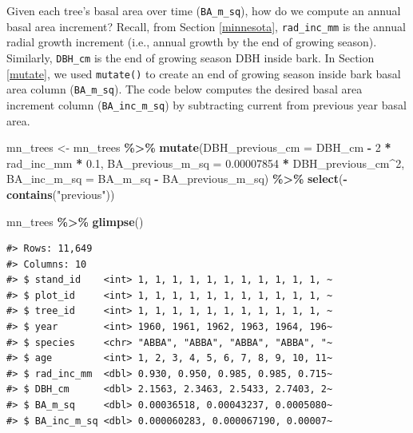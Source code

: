 \documentclass[
  11pt,
]{krantz}
\newenvironment{Shaded}{\begin{snugshade}}{\end{snugshade}}
\newcommand{\DataTypeTok}[1]{\textcolor[rgb]{0.13,0.29,0.53}{#1}}
\newcommand{\DecValTok}[1]{\textcolor[rgb]{0.00,0.00,0.81}{#1}}
\newcommand{\FloatTok}[1]{\textcolor[rgb]{0.00,0.00,0.81}{#1}}
\newcommand{\KeywordTok}[1]{\textcolor[rgb]{0.13,0.29,0.53}{\textbf{#1}}}
\newcommand{\NormalTok}[1]{#1}
\newcommand{\OperatorTok}[1]{\textcolor[rgb]{0.81,0.36,0.00}{\textbf{#1}}}
\newcommand{\StringTok}[1]{\textcolor[rgb]{0.31,0.60,0.02}{#1}}
\theoremstyle{definition}
\theoremstyle{definition}
\theoremstyle{definition}
\theoremstyle{definition}
\theoremstyle{remark}
\begin{document}
Given each tree's basal area over time (\texttt{BA\_m\_sq}), how do we compute an annual basal area increment? Recall, from Section \ref{minnesota}, \texttt{rad\_inc\_mm} is the annual radial growth increment (i.e., annual growth by the end of growing season). Similarly, \texttt{DBH\_cm} is the end of growing season DBH inside bark. In Section \ref{mutate}, we used \texttt{mutate()} to create an end of growing season inside bark basal area column (\texttt{BA\_m\_sq}). The code below computes the desired basal area increment column (\texttt{BA\_inc\_m\_sq}) by subtracting current from previous year basal area.

\begin{Shaded}
\begin{Highlighting}[]
\NormalTok{mn\_trees \textless{}{-}}\StringTok{ }\NormalTok{mn\_trees }\OperatorTok{\%\textgreater{}\%}\StringTok{ }
\StringTok{  }\KeywordTok{mutate}\NormalTok{(}\DataTypeTok{DBH\_previous\_cm =}\NormalTok{ DBH\_cm }\OperatorTok{{-}}\StringTok{ }\DecValTok{2} \OperatorTok{*}\StringTok{ }\NormalTok{rad\_inc\_mm }\OperatorTok{*}\StringTok{ }\FloatTok{0.1}\NormalTok{,}
         \DataTypeTok{BA\_previous\_m\_sq =} \FloatTok{0.00007854} \OperatorTok{*}\StringTok{ }\NormalTok{DBH\_previous\_cm}\OperatorTok{\^{}}\DecValTok{2}\NormalTok{,}
         \DataTypeTok{BA\_inc\_m\_sq =}\NormalTok{ BA\_m\_sq }\OperatorTok{{-}}\StringTok{ }\NormalTok{BA\_previous\_m\_sq) }\OperatorTok{\%\textgreater{}\%}
\StringTok{  }\KeywordTok{select}\NormalTok{(}\OperatorTok{{-}}\KeywordTok{contains}\NormalTok{(}\StringTok{"previous"}\NormalTok{))}

\NormalTok{mn\_trees }\OperatorTok{\%\textgreater{}\%}\StringTok{ }\KeywordTok{glimpse}\NormalTok{()}
\end{Highlighting}
\end{Shaded}

\begin{verbatim}
#> Rows: 11,649
#> Columns: 10
#> $ stand_id    <int> 1, 1, 1, 1, 1, 1, 1, 1, 1, 1, 1, ~
#> $ plot_id     <int> 1, 1, 1, 1, 1, 1, 1, 1, 1, 1, 1, ~
#> $ tree_id     <int> 1, 1, 1, 1, 1, 1, 1, 1, 1, 1, 1, ~
#> $ year        <int> 1960, 1961, 1962, 1963, 1964, 196~
#> $ species     <chr> "ABBA", "ABBA", "ABBA", "ABBA", "~
#> $ age         <int> 1, 2, 3, 4, 5, 6, 7, 8, 9, 10, 11~
#> $ rad_inc_mm  <dbl> 0.930, 0.950, 0.985, 0.985, 0.715~
#> $ DBH_cm      <dbl> 2.1563, 2.3463, 2.5433, 2.7403, 2~
#> $ BA_m_sq     <dbl> 0.00036518, 0.00043237, 0.0005080~
#> $ BA_inc_m_sq <dbl> 0.000060283, 0.000067190, 0.00007~
\end{verbatim}
\end{document}
